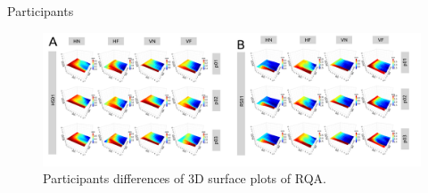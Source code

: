 \subsection{}
{

\begin{frame}{Participants
}
    \begin{figure}
        \includegraphics[width=1.0\linewidth]{./figs/results/3d-rqa-epsilons-participants/versions/drawing-v00}{}
	\caption{Participants differences of 3D surface plots of RQA.} 
   \end{figure}
	
\end{frame}
}


%
%	
%
